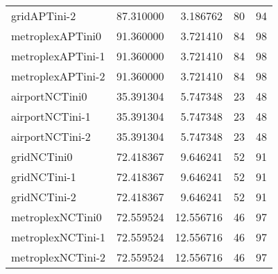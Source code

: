 \begin{table}[h]
\begin{longtable}{lrrrr}
gridAPTini-2 & 87.310000 & 3.186762 & 80 & 94 \\
metroplexAPTini0 & 91.360000 & 3.721410 & 84 & 98 \\
metroplexAPTini-1 & 91.360000 & 3.721410 & 84 & 98 \\
metroplexAPTini-2 & 91.360000 & 3.721410 & 84 & 98 \\
airportNCTini0 & 35.391304 & 5.747348 & 23 & 48 \\
airportNCTini-1 & 35.391304 & 5.747348 & 23 & 48 \\
airportNCTini-2 & 35.391304 & 5.747348 & 23 & 48 \\
gridNCTini0 & 72.418367 & 9.646241 & 52 & 91 \\
gridNCTini-1 & 72.418367 & 9.646241 & 52 & 91 \\
gridNCTini-2 & 72.418367 & 9.646241 & 52 & 91 \\
metroplexNCTini0 & 72.559524 & 12.556716 & 46 & 97 \\
metroplexNCTini-1 & 72.559524 & 12.556716 & 46 & 97 \\
metroplexNCTini-2 & 72.559524 & 12.556716 & 46 & 97 \\
\end{longtable}
\end{table}

